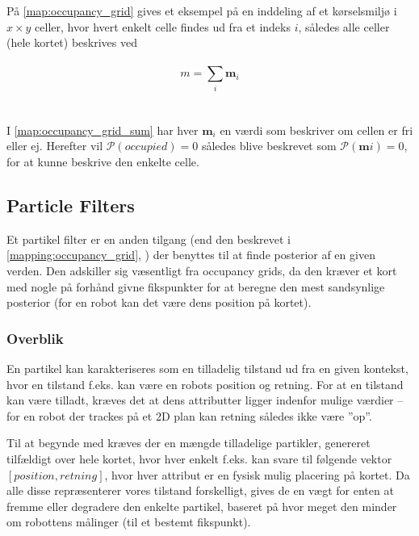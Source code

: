 På \cref{map:occupancy_grid} gives et eksempel på en inddeling af et kørselsmiljø i $x \times y$ celler, hvor hvert enkelt celle findes ud fra et indeks $i$, således alle celler (hele kortet) beskrives ved
\\\\
\begin{equation}\label{map:occupancy_grid_sum}
m = \sum\limits_{i} \mathbf{m}_{i}
\end{equation}
\\\\
I \cref{map:occupancy_grid_sum} har hver $\mathbf{m}_i$ en værdi som beskriver om cellen er fri eller ej.
Herefter vil $\mathcal{P}(occupied) = 0$ således blive beskrevet som $\mathcal{P}(\mathbf{m}i) = 0$, for at kunne beskrive den enkelte celle.

\subsection{Particle Filters}\label{mapping:particle_filter}
Et partikel filter er en anden tilgang (end den beskrevet i \cref{mapping:occupancy_grid}, ) der benyttes til at finde posterior af en given verden. 
Den adskiller sig væsentligt fra occupancy grids, da den kræver et kort med nogle på forhånd givne fikspunkter for at beregne den mest sandsynlige posterior (for en robot kan det være dens position på kortet).

\subsubsection{Overblik}
En partikel kan karakteriseres som en tilladelig tilstand ud fra en given kontekst, hvor en tilstand f.eks. kan være en robots position og retning.
For at en tilstand kan være tilladt, kræves det at dens attributter ligger indenfor mulige værdier -- for en robot der trackes på et 2D plan kan retning således ikke være ''op''.

Til at begynde med kræves der en mængde tilladelige partikler, genereret tilfældigt over hele kortet, hvor hver enkelt f.eks. kan svare til følgende vektor $[\mathit{position}, \mathit{retning}]$, hvor hver attribut er en fysisk mulig placering på kortet.
Da alle disse repræsenterer vores tilstand forskelligt, gives de en vægt for enten at fremme eller degradere den enkelte partikel, baseret på hvor meget den 
minder om robottens målinger (til et bestemt fikspunkt).

